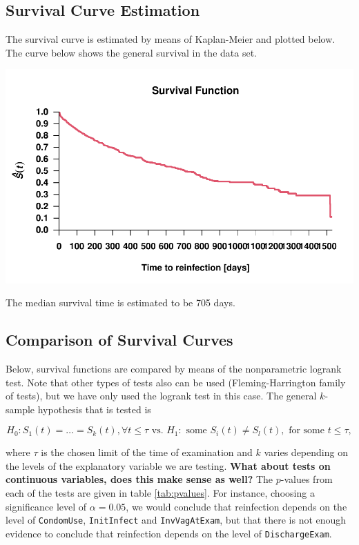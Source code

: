 \documentclass[
]{article}
\begin{document}
\hypertarget{survival-curve-estimation}{%
\subsection{Survival Curve Estimation}\label{survival-curve-estimation}}

The survival curve is estimated by means of Kaplan-Meier and plotted below. The curve below shows the general survival in the data set.

\includegraphics{practical_files/figure-latex/unnamed-chunk-1-1.pdf}

The median survival time is estimated to be 705 days.

\hypertarget{comparison-of-survival-curves}{%
\subsection{Comparison of Survival Curves}\label{comparison-of-survival-curves}}

Below, survival functions are compared by means of the nonparametric logrank test. Note that other types of tests also can be used (Fleming-Harrington family of tests), but we have only used the logrank test in this case. The general \(k\)-sample hypothesis that is tested is

\begin{equation*}
        H_0: S_1(t) = \ldots = S_k(t), \forall t \leq \tau \text{ vs. } H_1: \text{ some } S_i(t) \neq S_l(t), \text{ for some } t \leq \tau,
\end{equation*}

where \(\tau\) is the chosen limit of the time of examination and \(k\) varies depending on the levels of the explanatory variable we are testing. \textbf{What about tests on continuous variables, does this make sense as well?} The \(p\)-values from each of the tests are given in table \ref{tab:pvalues}. For instance, choosing a significance level of \(\alpha = 0.05\), we would conclude that reinfection depends on the level of \texttt{CondomUse}, \texttt{InitInfect} and \texttt{InvVagAtExam}, but that there is not enough evidence to conclude that reinfection depends on the level of \texttt{DischargeExam}.
\end{document}

